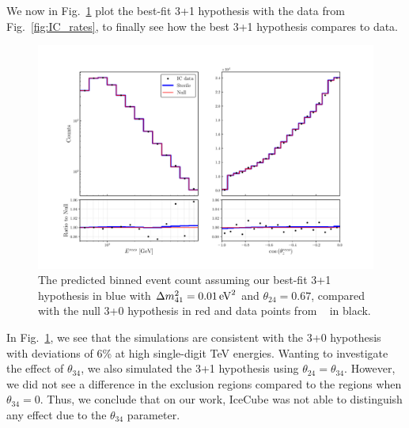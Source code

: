 We now in Fig.~\ref{fig:final_rate_plot} plot the best-fit 3+1 hypothesis with the data from Fig.~\ref{fig:IC_rates}, to finally see how the best 
3+1 hypothesis compares to data.
\begin{figure}
    \centering
    \includegraphics[width=1\textwidth]{figures/final_rate_plot.pdf}
    \caption{The predicted binned event count assuming our best-fit 3+1 hypothesis in blue with $\dm[41] = \SI{0.01}{\eV^2}$ and $\theta_{24} = 0.67$, compared with the 
    null 3+0 hypothesis in red and data points from ~\cite{IC2020} in black.}\label{fig:final_rate_plot}
\end{figure}

In Fig.~\ref{fig:final_rate_plot}, we see that the simulations are consistent with the 3+0 hypothesis with deviations of 6\% at high single-digit 
\si{\TeV} energies.
Wanting to investigate the effect of $\theta_{34}$, we also simulated the 3+1 hypothesis using $\theta_{24} = \theta_{34}$. However, we did not see 
a difference in the exclusion regions compared to the regions when $\theta_{34} = 0$. Thus, we conclude that on our work, IceCube was not able to 
distinguish any effect due to the $\theta_{34}$ parameter.